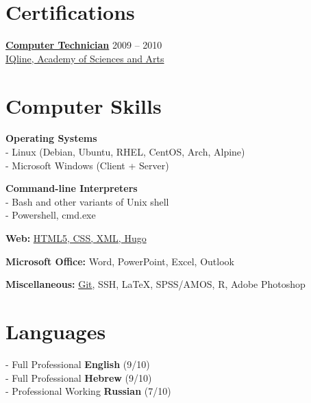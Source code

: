 \documentclass[
	12pt,a4paper %
]{article}
\newcommand{\tableentry}[3]{
	\textsc{#1} & #2\expandafter\ifstrequal\expandafter{#3}{}{\\}{\\[5pt]} %
}
\begin{document}
\begin{paracol}{2} %

\section{Certifications}

\href{https://loona-il.000webhostapp.com/resume-references/computer-technitian-certificate.jpg}{\textbf{Computer Technician}} \hfill 2009 -- 2010 \\
\href{https://loona-il.000webhostapp.com/resume-references/computer-technitian-certificate.jpg}{IQline, Academy of Sciences and Arts}

\section{Computer Skills}

\textbf{Operating Systems} \\
 - Linux (Debian, Ubuntu, RHEL, CentOS, Arch, Alpine)\\
 - Microsoft Windows (Client + Server)

\textbf{Command-line Interpreters} \\
- Bash and other variants of Unix shell \\
- Powershell, cmd.exe

\textbf{Web:} \href{https://kirilu.netlify.app/resume/}{HTML5, CSS, XML, Hugo}

\textbf{Microsoft Office:} Word, PowerPoint, Excel, Outlook

\textbf{Miscellaneous:} \href{https://github.com/kiril.u}{Git}, SSH, LaTeX, SPSS/AMOS, R, Adobe Photoshop

\switchcolumn

\section{Languages}
 - Full Professional \textbf{English} (9/10) \\
 - Full Professional \textbf{Hebrew} (9/10) \\
 - Professional Working \textbf{Russian} (7/10)

\end{paracol}
\end{document}
